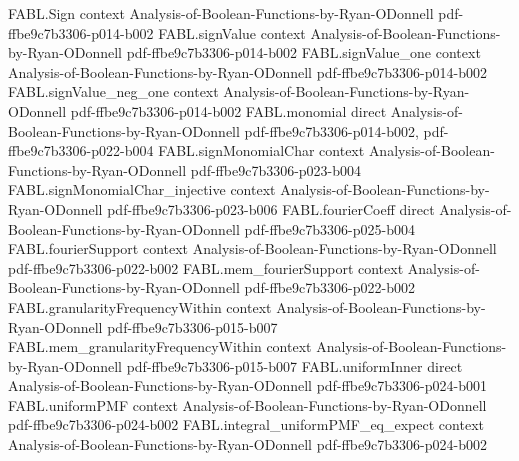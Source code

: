 \begin{theorem}
\label{FABL.FiniteFourierBasis.orthogonalComponent_eq_fourierComponentAtSupport}
\leanok
{}
\proofstep
  {FABL.Sign}
  {context}
  {Analysis-of-Boolean-Functions-by-Ryan-ODonnell}
  {pdf-ffbe9c7b3306-p014-b002}
\proofstep
  {FABL.signValue}
  {context}
  {Analysis-of-Boolean-Functions-by-Ryan-ODonnell}
  {pdf-ffbe9c7b3306-p014-b002}
\proofstep
  {FABL.signValue_one}
  {context}
  {Analysis-of-Boolean-Functions-by-Ryan-ODonnell}
  {pdf-ffbe9c7b3306-p014-b002}
\proofstep
  {FABL.signValue_neg_one}
  {context}
  {Analysis-of-Boolean-Functions-by-Ryan-ODonnell}
  {pdf-ffbe9c7b3306-p014-b002}
\proofstep
  {FABL.monomial}
  {direct}
  {Analysis-of-Boolean-Functions-by-Ryan-ODonnell}
  {pdf-ffbe9c7b3306-p014-b002,
    pdf-ffbe9c7b3306-p022-b004}
\proofstep
  {FABL.signMonomialChar}
  {context}
  {Analysis-of-Boolean-Functions-by-Ryan-ODonnell}
  {pdf-ffbe9c7b3306-p023-b004}
\proofstep
  {FABL.signMonomialChar_injective}
  {context}
  {Analysis-of-Boolean-Functions-by-Ryan-ODonnell}
  {pdf-ffbe9c7b3306-p023-b006}
\proofstep
  {FABL.fourierCoeff}
  {direct}
  {Analysis-of-Boolean-Functions-by-Ryan-ODonnell}
  {pdf-ffbe9c7b3306-p025-b004}
\proofstep
  {FABL.fourierSupport}
  {context}
  {Analysis-of-Boolean-Functions-by-Ryan-ODonnell}
  {pdf-ffbe9c7b3306-p022-b002}
\proofstep
  {FABL.mem_fourierSupport}
  {context}
  {Analysis-of-Boolean-Functions-by-Ryan-ODonnell}
  {pdf-ffbe9c7b3306-p022-b002}
\proofstep
  {FABL.granularityFrequencyWithin}
  {context}
  {Analysis-of-Boolean-Functions-by-Ryan-ODonnell}
  {pdf-ffbe9c7b3306-p015-b007}
\proofstep
  {FABL.mem_granularityFrequencyWithin}
  {context}
  {Analysis-of-Boolean-Functions-by-Ryan-ODonnell}
  {pdf-ffbe9c7b3306-p015-b007}
\proofstep
  {FABL.uniformInner}
  {direct}
  {Analysis-of-Boolean-Functions-by-Ryan-ODonnell}
  {pdf-ffbe9c7b3306-p024-b001}
\proofstep
  {FABL.uniformPMF}
  {context}
  {Analysis-of-Boolean-Functions-by-Ryan-ODonnell}
  {pdf-ffbe9c7b3306-p024-b002}
\proofstep
  {FABL.integral_uniformPMF_eq_expect}
  {context}
  {Analysis-of-Boolean-Functions-by-Ryan-ODonnell}
  {pdf-ffbe9c7b3306-p024-b002}
\proofstep

\end{theorem}
